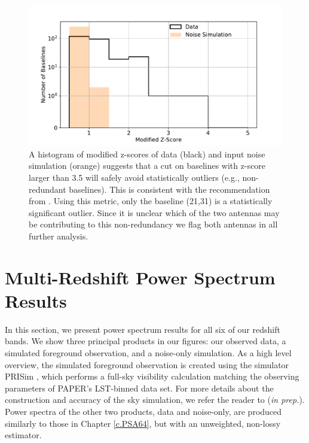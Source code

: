 \begin{figure}[tp]
	\centering
	\includegraphics[width=.85\textwidth]{plots/zscore_hist.pdf}
	\caption{A histogram of modified z-scores of data (black) 
		and input noise simulation (orange) suggests that a cut on baselines
		with z-score larger than 3.5 will safely avoid statistically outliers (e.g., non-redundant baselines). This is consistent with the
		recommendation from \cite{Iglewicz_and_hoaglin}. Using this metric,
		only the baseline (21,31) is a statistically significant outlier. Since it is unclear which of the two antennas may be contributing to this non-redundancy we flag both antennas in all further analysis.} %
\label{fig:mod_z_score_avg}
\end{figure}

\section{Multi-Redshift Power Spectrum Results}\label{sec:pspec_results}

In this section, we present power spectrum results for all six of our redshift bands. We show three principal products in our figures: our observed data, a simulated foreground observation, and a noise-only simulation. As a high level overview, the simulated foreground observation is created using the simulator PRISim \citep{Thyagarajan_et_al2015b, Thyagarajan_et_al2015a}, which performs a full-sky visibility calculation matching the observing parameters of PAPER's LST-binned data set. For more details about the construction and accuracy of the sky simulation, we refer the reader to \citet{kolopanis_et_al2019} (\textit{in prep.}). Power spectra of the other two products, data and noise-only, are produced similarly to those in Chapter \ref{c.PSA64}, but with an unweighted, non-lossy estimator.

